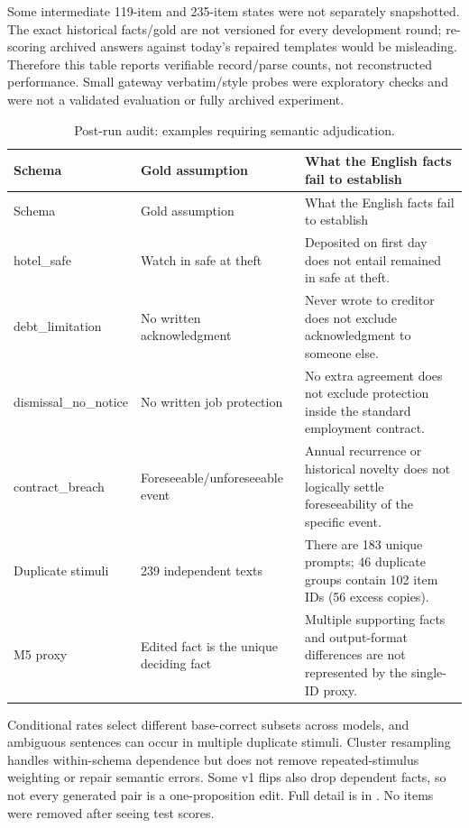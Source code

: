 Some intermediate 119-item and 235-item states were not separately snapshotted. The exact historical facts/gold are not versioned for every development round; re-scoring archived answers against today's repaired templates would be misleading. Therefore this table reports verifiable record/parse counts, not reconstructed performance. Small gateway verbatim/style probes were exploratory checks and were not a validated evaluation or fully archived experiment.

\begingroup\small\setlength{\tabcolsep}{4pt}
\begin{longtable}{p{3.4cm}p{4.7cm}p{7.1cm}}
\caption{Post-run audit: examples requiring semantic adjudication.}\\
\toprule
Schema & Gold assumption & What the English facts fail to establish \\
\midrule\endfirsthead
\toprule
Schema & Gold assumption & What the English facts fail to establish \\
\midrule\endhead
\bottomrule\endfoot
hotel\_safe & Watch in safe at theft & Deposited on first day does not entail remained in safe at theft. \\
debt\_limitation & No written acknowledgment & Never wrote to creditor does not exclude acknowledgment to someone else. \\
dismissal\_no\_notice & No written job protection & No extra agreement does not exclude protection inside the standard employment contract. \\
contract\_breach & Foreseeable/unforeseeable event & Annual recurrence or historical novelty does not logically settle foreseeability of the specific event. \\
Duplicate stimuli & 239 independent texts & There are 183 unique prompts; 46 duplicate groups contain 102 item IDs (56 excess copies). \\
M5 proxy & Edited fact is the unique deciding fact & Multiple supporting facts and output-format differences are not represented by the single-ID proxy. \\
\end{longtable}\endgroup


Conditional rates select different base-correct subsets across models, and ambiguous sentences can occur in multiple duplicate stimuli. Cluster resampling handles within-schema dependence but does not remove repeated-stimulus weighting or repair semantic errors. Some v1 flips also drop dependent facts, so not every generated pair is a one-proposition edit. Full detail is in . No items were removed after seeing test scores.

